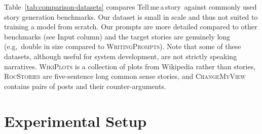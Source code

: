 \documentclass{article}
\newcommand{\Agentsroom}{\textsc{Agents' Room}}
\newcommand{\tellmeastory}{{\sc Tell$\,$me$\,$a$\,$story}}
\newcommand{\todo}[1]{{\textcolor{red}{\bf{TODO:} \emph{#1}}}}
\newcommand{\fantine}[1]{{\textcolor{blue}{\bf{Fantine:} \emph{#1}}}}
\begin{document}
Table~\ref{tab:comparison-datasets} compares \tellmeastory\ against commonly used story generation benchmarks. Our dataset is small in scale and thus not suited to training a model from scratch. Our prompts are more detailed compared to other benchmarks (see Input column) and the target stories are genuinely long (e.g,~double in size compared to \textsc{WritingPrompts}). Note that some of these datasets, although useful for system development, are not strictly speaking narratives. \textsc{WikiPlots} is a collection of  plots from Wikipedia rather  than stories, \textsc{RocStories} are five-sentence long common sense stories, and \textsc{ChangeMyView} contains pairs of posts and their counter-arguments. 








\section{Experimental Setup}
\label{sec:experimental_setup}

\end{document}
